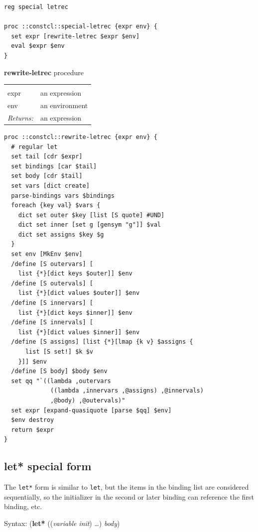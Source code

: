 \documentclass[twoside]{report}
\begin{document}
\begin{lstlisting}
reg special letrec

proc ::constcl::special-letrec {expr env} {
  set expr [rewrite-letrec $expr $env]
  eval $expr $env
}
\end{lstlisting}

\textbf{rewrite-letrec} procedure

\noindent\begin{tabular}{ |p{1.9cm} p{8cm}| }
\hline
\rowcolor[HTML]{CCCCCC} \multicolumn{2}{|l|}{\bf rewrite-letrec (internal)} \\
expr & an expression \\
env & an environment \\
\textit{Returns:} & an expression \\
\hline
\end{tabular}

\begin{lstlisting}
proc ::constcl::rewrite-letrec {expr env} {
  # regular let
  set tail [cdr $expr]
  set bindings [car $tail]
  set body [cdr $tail]
  set vars [dict create]
  parse-bindings vars $bindings
  foreach {key val} $vars {
    dict set outer $key [list [S quote] #UND]
    dict set inner [set g [gensym "g"]] $val
    dict set assigns $key $g
  }
  set env [MkEnv $env]
  /define [S outervars] [
    list {*}[dict keys $outer]] $env
  /define [S outervals] [
    list {*}[dict values $outer]] $env
  /define [S innervars] [
    list {*}[dict keys $inner]] $env
  /define [S innervals] [
    list {*}[dict values $inner]] $env
  /define [S assigns] [list {*}[lmap {k v} $assigns {
      list [S set!] $k $v
    }]] $env
  /define [S body] $body $env
  set qq "`((lambda ,outervars
             ((lambda ,innervars ,@assigns) ,@innervals)
             ,@body) ,@outervals)"
  set expr [expand-quasiquote [parse $qq] $env]
  $env destroy
  return $expr
}
\end{lstlisting}

\subsection{let* special form}
\label{let-special-form1}

The \texttt{let*} form is similar to \texttt{let}, but the items in the binding list are considered sequentially, so the initializer in the second or later binding can reference the first binding, etc.

Syntax: (\textbf{let*} ((\emph{variable} \emph{init}) \ldots ) \emph{body})
\end{document}
